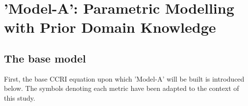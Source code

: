     
    

\section{'Model-A': Parametric Modelling with Prior Domain Knowledge}



\subsection{The base model}

First, the base CCRI equation \cite{CryptoCarbonRatingsInstitute2022TheNetwork} upon which 'Model-A' will be built is introduced below. The symbols denoting each metric have been adapted to the context of this study.

